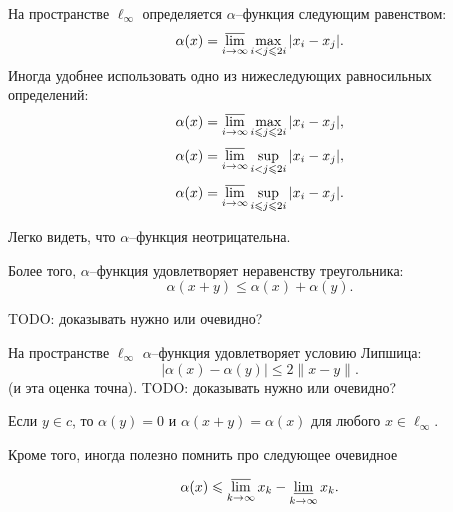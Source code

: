 На пространстве $\ell_\infty$ определяется $\alpha$--функция следующим равенством:
\begin{equation}
	\alpha(x) = \varlimsup_{i\to\infty} \max_{i<j\leqslant 2i} |x_i - x_j|
	.
\end{equation}
Иногда удобнее использовать одно из нижеследующих равносильных определений:
\begin{equation}
	\alpha(x) = \varlimsup_{i\to\infty} \max_{i \leqslant j\leqslant 2i} |x_i - x_j|
	,
\end{equation}
\begin{equation}
	\alpha(x) = \varlimsup_{i\to\infty} \sup_{i<j\leqslant 2i} |x_i - x_j|
	,
\end{equation}
\begin{equation}
	\alpha(x) = \varlimsup_{i\to\infty} \sup_{i \leqslant j\leqslant 2i} |x_i - x_j|
	.
\end{equation}

Легко видеть, что $\alpha$--функция неотрицательна.
\begin{property}
	Более того, $\alpha$--функция удовлетворяет неравенству треугольника:
	\begin{equation}
		\alpha(x+y) \leq \alpha(x) + \alpha(y)
		.
	\end{equation}
\end{property}
TODO: доказывать нужно или очевидно?

\begin{property}
	На пространстве $\ell_\infty$ $\alpha$--функция удовлетворяет условию Липшица:
	\begin{equation}\label{alpha_Lipshitz}
		|\alpha(x) - \alpha(y)| \leq 2 \|x-y\|
		.
	\end{equation}
	(и эта оценка точна).
	TODO: доказывать нужно или очевидно?
\end{property}

\begin{property}
	Если $y\in c$, то $\alpha(y) = 0$ и $\alpha(x+y) = \alpha(x)$ для любого $x \in \ell_\infty$.
\end{property}

Кроме того, иногда полезно помнить про следующее очевидное
\begin{property}
	\label{thm:alpha_x_leq_limsup_minus_liminf}
	\begin{equation}
		\alpha(x) \leq \varlimsup_{k\to\infty} x_k - \varliminf_{k\to\infty} x_k
		.
	\end{equation}
\end{property}
